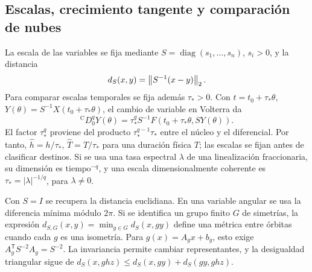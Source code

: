 \subsection{Escalas, crecimiento tangente y comparación de nubes}
\label{bre:num:metricas}

La escala de las variables se fija mediante
$S=\operatorname{diag}(s_1,\ldots,s_n)$, $s_i>0$, y la distancia
\begin{equation}
 d_S(x,y)=\left\lVert S^{-1}(x-y)\right\rVert_2.
 \label{bre:num:distancia}
\end{equation}
Para comparar escalas temporales se fija además \(\tau_*>0\). Con
\(t=t_0+\tau_*\theta\), \(Y(\theta)=S^{-1}X(t_0+\tau_*\theta)\), el
cambio de variable en Volterra da
\[
 {}^{\mathrm C}D_0^qY(\theta)
 =\tau_*^q S^{-1}F(t_0+\tau_*\theta,SY(\theta)).
\]
El factor \(\tau_*^q\) proviene del producto
\(\tau_*^{q-1}\tau_*\) entre el núcleo y el diferencial. Por tanto,
\(\widehat h=h/\tau_*\), \(\widehat T=T/\tau_*\) para una duración física \(T\); las escalas se
fijan antes de clasificar destinos. Si se usa una tasa espectral
\(\lambda\) de una linealización fraccionaria, su dimensión es
\(\mathrm{tiempo}^{-q}\), y una escala dimensionalmente coherente es
\(\tau_*=|\lambda|^{-1/q}\), para \(\lambda\ne0\).

Con $S=I$ se recupera la distancia euclidiana. En una variable angular se
usa la diferencia mínima módulo $2\pi$. Si se identifica un grupo finito
$G$ de simetrías, la expresión
$d_{S,G}(x,y)=\min_{g\in G}d_S(x,gy)$ define una métrica entre órbitas
cuando cada $g$ es una isometría. Para $g(x)=A_gx+b_g$, esto exige
$A_g^{\mathsf T}S^{-2}A_g=S^{-2}$. La invariancia permite cambiar
representantes, y la desigualdad triangular sigue de
$d_S(x,ghz)\leq d_S(x,gy)+d_S(gy,ghz)$.

